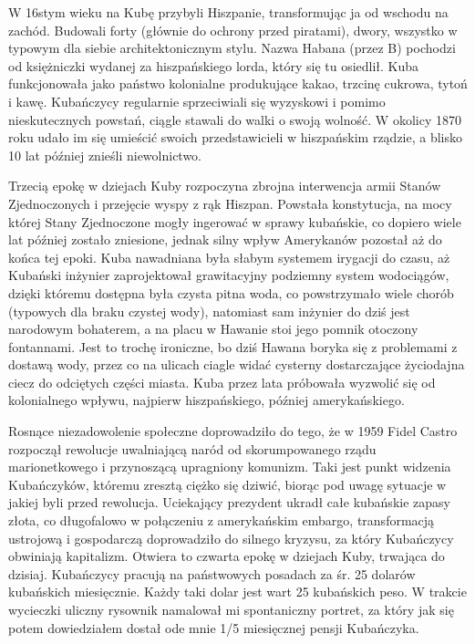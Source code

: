 \par W 16stym wieku na Kubę przybyli Hiszpanie, transformując ja od wschodu na zachód.
Budowali forty (głównie do ochrony przed piratami), dwory, wszystko w typowym dla siebie architektonicznym stylu.
Nazwa Habana (przez B) pochodzi od księżniczki wydanej za hiszpańskiego lorda, który się tu osiedlił.
Kuba funkcjonowała jako państwo kolonialne produkujące kakao, trzcinę cukrowa, tytoń i kawę.
Kubańczycy regularnie sprzeciwiali się wyzyskowi i pomimo nieskutecznych powstań, ciągle stawali do walki o swoją wolność. 
W okolicy 1870 roku udało im się umieścić swoich przedstawicieli w hiszpańskim rządzie, a blisko 10 lat później znieśli niewolnictwo.
\par Trzecią epokę w dziejach Kuby rozpoczyna zbrojna interwencja armii Stanów Zjednoczonych i przejęcie wyspy z rąk Hiszpan.
Powstała konstytucja, na mocy której Stany Zjednoczone mogły ingerować w sprawy kubańskie, co dopiero wiele lat później zostało zniesione, jednak silny wpływ Amerykanów pozostał aż do końca tej epoki.
Kuba nawadniana była słabym systemem irygacji do czasu, aż Kubański inżynier zaprojektował grawitacyjny podziemny system wodociągów, dzięki któremu dostępna była czysta pitna woda, co powstrzymało wiele chorób (typowych dla braku czystej wody), natomiast sam inżynier do dziś jest narodowym bohaterem, a na placu w Hawanie stoi jego pomnik otoczony fontannami.
Jest to trochę ironiczne, bo dziś Hawana boryka się z problemami z dostawą wody, przez co na ulicach ciagle widać cysterny dostarczające życiodajna ciecz do odciętych części miasta.
Kuba przez lata próbowała wyzwolić się od kolonialnego wpływu, najpierw hiszpańskiego, później amerykańskiego.
\par Rosnące niezadowolenie społeczne doprowadziło do tego, że w 1959 Fidel Castro rozpoczął rewolucje uwalniającą naród od skorumpowanego rządu marionetkowego i przynoszącą upragniony komunizm.
Taki jest punkt widzenia Kubańczyków, któremu zresztą ciężko się dziwić, biorąc pod uwagę sytuacje w jakiej byli przed rewolucja.
Uciekający prezydent ukradł całe kubańskie zapasy złota, co długofalowo w połączeniu z amerykańskim embargo, transformacją ustrojową i gospodarczą doprowadziło do silnego kryzysu, za który Kubańczycy obwiniają kapitalizm.
Otwiera to czwarta epokę w dziejach Kuby, trwająca do dzisiaj.
Kubańczycy pracują na państwowych posadach za śr.
25 dolarów kubańskich miesięcznie.
Każdy taki dolar jest wart 25 kubańskich peso.
W trakcie wycieczki uliczny rysownik namalował mi spontaniczny portret, za który jak się potem dowiedziałem dostał ode mnie 1/5 miesięcznej pensji Kubańczyka.
